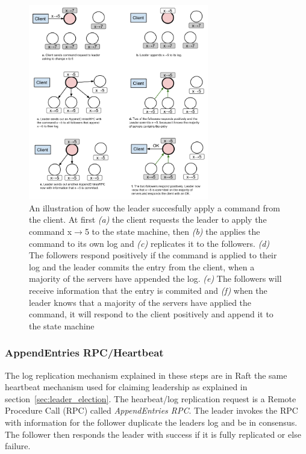 \begin{figure}[ht!]
  \centering
  \includegraphics[width=0.7\textwidth]{figures/log-replication-example.png}
  \caption{An illustration of how the leader succesfully apply a command from the client. At first \emph{(a)} the client requests the leader to apply the command x$\rightarrow$5 to the state machine, then \emph{(b)} the applies the command to its own log and \emph{(c)} replicates it to the followers. \emph{(d)} The followers respond positively if the command is applied to their log and the leader commits the entry from the client, when a majority of the servers have appended the log. \emph{(e)} The followers will receive information that the entry is commited and \emph{(f)} when the leader knows that a majority of the servers have applied the command, it will respond to the client positively and append it to the state machine}
  \label{fig:log_replication_example}
\end{figure}

\subsubsection{AppendEntries RPC/Heartbeat} %
\label{ssub:appendentries_rpc_heartbeat}

The log replication mechanism explained in these steps are in Raft the same heartbeat mechanism used for claiming leadership as explained in section~\ref{sec:leader_election}. The hearbeat/log replication request is a Remote Procedure Call (RPC) called \emph{AppendEntries RPC}. The leader invokes the RPC with information for the follower duplicate the leaders log and be in consensus. The follower then responds the leader with success if it is fully replicated or else failure.

